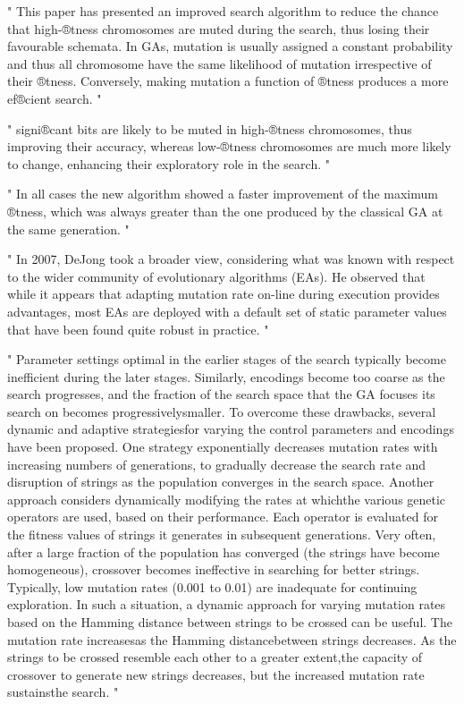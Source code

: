 "
This paper has presented an improved search algorithm to reduce the chance that high-®tness chromosomes are muted during the search, thus losing their favourable schemata. In GAs, mutation is usually assigned a constant probability and thus all chromosome have the same likelihood of mutation irrespective of their ®tness. Conversely, making mutation a function of ®tness produces a more ef®cient search.
"\cite{marsili_libelli_adaptive_2000}

"
signi®cant bits are likely to be muted in high-®tness chromosomes, thus improving their accuracy, whereas low-®tness chromosomes are much more likely to change, enhancing their exploratory role in the search.
"\cite{marsili_libelli_adaptive_2000}

"
In all cases the new algorithm showed a faster improvement of the maximum ®tness, which was always greater than the one produced by the classical GA at the same generation.
"\cite{marsili_libelli_adaptive_2000}


"
In 2007, DeJong took a broader view, considering what was known with respect to the wider community of evolutionary algorithms (EAs). He observed that while it appears that adapting mutation rate on-line during execution provides advantages, most EAs are deployed with a default set of static parameter values that have been found quite robust in practice.
"\cite{mills_determining_2015}

"
Parameter settings optimal in the earlier stages of the search typically become inefficient during the later stages. Similarly, encodings become too coarse as the search progresses, and the fraction of the search space that the GA focuses its search on becomes progressivelysmaller. To overcome these drawbacks, several dynamic and adaptive strategiesfor varying the control parameters and encodings have been proposed. One strategy exponentially decreases mutation rates with increasing numbers of generations, to gradually decrease the search rate and disruption of strings as the population converges in the search space. Another approach considers dynamically modifying the rates at whichthe various genetic operators are used, based on their performance. Each operator is evaluated for the fitness values of strings it generates in subsequent generations. Very often, after a large fraction of the population has converged (the strings have become homogeneous), crossover becomes ineffective in searching for better strings. Typically, low mutation rates (0.001 to 0.01) are inadequate for continuing exploration. In such a situation, a dynamic approach for varying mutation rates based on the Hamming distance between strings to be crossed can be useful. The mutation rate increasesas the Hamming distancebetween strings decreases. As the strings to be crossed resemble each other to a greater extent,the capacity of crossover to generate new strings decreases, but the increased mutation rate sustainsthe search.
"\cite{srinivas_genetic_1994}


